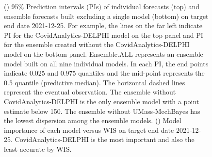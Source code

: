 \documentclass{article}
\theoremstyle{definition}
\begin{document}
\begin{figure}
\begin{subfigure}{\textwidth}
		\label{fig:plot-wis_imp20211225}
\end{subfigure}
\caption{() 95\% Prediction intervals (PIs) of individual forecasts (top) and ensemble forecasts built excluding a single model (bottom) on target end date 2021-12-25. For example, the lines on the far left indicate PI for the CovidAnalytics-DELPHI model on the top panel and PI for the ensemble created without the CovidAnalytics-DELPHI model on the bottom panel. Ensemble.ALL represents an ensemble model built on all nine individual models. In each PI, the  end points indicate 0.025 and 0.975 quantiles and the mid-point represents the 0.5 quantile (predictive median). The horizontal dashed lines represent the eventual observation. The ensemble without CovidAnalytics-DELPHI is the only ensemble model with a point estimate below 150. The ensemble without UMass-MechBayes has the lowest dispersion
among the ensemble models. () Model importance of each model versus WIS on target end date 2021-12-25. CovidAnalytics-DELPHI is the most important and also the least accurate by WIS.}
	\label{fig:20211225}
\end{figure}
\end{document}
